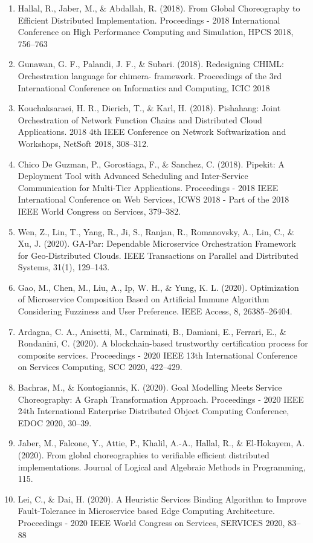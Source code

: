\documentclass{article}
\begin{document}
\begin{enumerate}
\item Hallal, R., Jaber, M., \& Abdallah, R. (2018). From Global Choreography to Efficient Distributed Implementation. Proceedings - 2018 International Conference on High Performance Computing and Simulation, HPCS 2018, 756–763

\item Gunawan, G. F., Palandi, J. F., \& Subari. (2018). Redesigning CHIML: Orchestration language for chimera- framework. Proceedings of the 3rd International Conference on Informatics and Computing, ICIC 2018

\item Kouchaksaraei, H. R., Dierich, T., \& Karl, H. (2018). Pishahang: Joint Orchestration of Network Function Chains and Distributed Cloud Applications. 2018 4th IEEE Conference on Network Softwarization and Workshops, NetSoft 2018, 308–312.

\item Chico De Guzman, P., Gorostiaga, F., \& Sanchez, C. (2018). Pipekit: A Deployment Tool with Advanced Scheduling and Inter-Service Communication for Multi-Tier Applications. Proceedings - 2018 IEEE International Conference on Web Services, ICWS 2018 - Part of the 2018 IEEE World Congress on Services, 379–382.

\item Wen, Z., Lin, T., Yang, R., Ji, S., Ranjan, R., Romanovsky, A., Lin, C., \& Xu, J. (2020). GA-Par: Dependable Microservice Orchestration Framework for Geo-Distributed Clouds. IEEE Transactions on Parallel and Distributed Systems, 31(1), 129–143.

\item Gao, M., Chen, M., Liu, A., Ip, W. H., \& Yung, K. L. (2020). Optimization of Microservice Composition Based on Artificial Immune Algorithm Considering Fuzziness and User Preference. IEEE Access, 8, 26385–26404.

\item Ardagna, C. A., Anisetti, M., Carminati, B., Damiani, E., Ferrari, E., \& Rondanini, C. (2020). A blockchain-based trustworthy certification process for composite services. Proceedings - 2020 IEEE 13th International Conference on Services Computing, SCC 2020, 422–429.

\item Bachras, M., \& Kontogiannis, K. (2020). Goal Modelling Meets Service Choreography: A Graph Transformation Approach. Proceedings - 2020 IEEE 24th International Enterprise Distributed Object Computing Conference, EDOC 2020, 30–39.

\item Jaber, M., Falcone, Y., Attie, P., Khalil, A.-A., Hallal, R., \& El-Hokayem, A. (2020). From global choreographies to verifiable efficient distributed implementations. Journal of Logical and Algebraic Methods in Programming, 115.

\item Lei, C., \& Dai, H. (2020). A Heuristic Services Binding Algorithm to Improve Fault-Tolerance in Microservice based Edge Computing Architecture. Proceedings - 2020 IEEE World Congress on Services, SERVICES 2020, 83–88

\end{enumerate}
\end{document}
